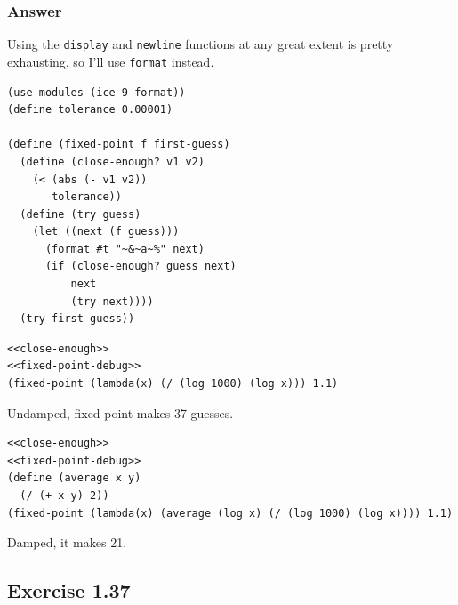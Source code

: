 \documentclass[final,fleqn,titlepage,twoside]{article}
\begin{document}
\subsubsection{Answer}
\label{sec:org3527e24}
Using the \texttt{display} and \texttt{newline} functions at any great
extent is pretty exhausting, so I'll use \texttt{format} instead.
\begin{verbatim}
(use-modules (ice-9 format))
(define tolerance 0.00001)

(define (fixed-point f first-guess)
  (define (close-enough? v1 v2)
    (< (abs (- v1 v2)) 
       tolerance))
  (define (try guess)
    (let ((next (f guess)))
      (format #t "~&~a~%" next)
      (if (close-enough? guess next)
          next
          (try next))))
  (try first-guess))
\end{verbatim}

\begin{verbatim}
<<close-enough>>
<<fixed-point-debug>>
(fixed-point (lambda(x) (/ (log 1000) (log x))) 1.1)
\end{verbatim}

Undamped, fixed-point makes 37 guesses.

\begin{verbatim}
<<close-enough>>
<<fixed-point-debug>>
(define (average x y)
  (/ (+ x y) 2))
(fixed-point (lambda(x) (average (log x) (/ (log 1000) (log x)))) 1.1)
\end{verbatim}

Damped, it makes 21.

\subsection{Exercise 1.37}
\label{sec:org113eb4d}
\end{document}
